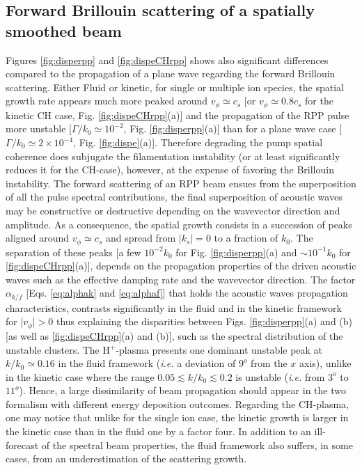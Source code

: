 \documentclass[
 reprint,
 amsmath,amssymb,
 aps,
]{revtex4-1}
\begin{document}
\subsection{Forward Brillouin scattering of a  spatially smoothed beam}
Figures \ref{fig:disperpp} and \ref{fig:dispeCHrpp} shows also significant differences compared to the propagation of a plane wave  regarding the forward Brillouin scattering.  
Either Fluid or kinetic, for single or multiple ion species, 
the spatial growth rate appears much more peaked around $v_\phi\simeq c_s$ [or $v_\phi\simeq 0.8c_s$ for  the kinetic CH case, Fig. \ref{fig:dispeCHrpp}(a)] and the propagation of the RPP pulse more unstable  [$\Gamma/k_0\simeq  10^{-2}$, Fig.  \ref{fig:disperpp}(a)]  than for a plane wave case  [$\Gamma/k_0\simeq 2 \times 10^{-4}$, Fig.  \ref{fig:dispe}(a)].
Therefore degrading the pump spatial coherence does subjugate the filamentation instability (or at least significantly reduces it for the CH-case), however, at the expense of favoring the Brillouin instability.
The forward scattering of an RPP beam ensues from the superposition of all the pulse spectral contributions, the final superposition of acoustic waves may be constructive or destructive depending on the wavevector direction and amplitude. As a consequence, the spatial growth consists in a succession of peaks aligned around $v_\phi\simeq c_s$ and spread from $\vert k_s\vert=0$ to a fraction of $k_0$. The separation of these peaks [a few $ 10^{-2}k_0$ for Fig. \ref{fig:disperpp}(a) and $\sim 10^{-1}k_0$ for \ref{fig:dispeCHrpp}(a)], depends on the propagation properties of the driven acoustic waves such as the effective damping rate and the wavevector direction. 
The factor $\alpha_{k/f}$ [Eqs. \eqref{eq:alphak} and  \eqref{eq:alphaf}] that  holds the acoustic waves propagation characteristics, contrasts  significantly in the fluid and in the kinetic framework for $\vert v_\phi\vert>0$ thus explaining the disparities between Figs. \ref{fig:disperpp}(a) and (b) [as well as  \ref{fig:dispeCHrpp}(a) and (b)], such as the spectral distribution of the unstable clusters. 
The H$^+$-plasma presents one dominant unstable peak at $k/k_0\simeq 0.16$  in the fluid framework (\emph{i.e.} a deviation of $9^o$ from the $x$ axis), unlike in the kinetic case where the range  $0.05 \lesssim k/k_0\lesssim 0.2$ is unstable (\emph{i.e.} from  $3^o$ to $11^o$). Hence, a large dissimilarity of beam propagation  should appear in the two formalism  with different energy deposition outcomes. Regarding the CH-plasma, one may notice that unlike for the single ion case, the kinetic growth  is larger in the kinetic case than in the fluid one by a factor four. In addition to an ill-forecast  of the spectral beam properties, the fluid framework also suffers, in some cases, from an underestimation of the scattering growth. 
\end{document}
